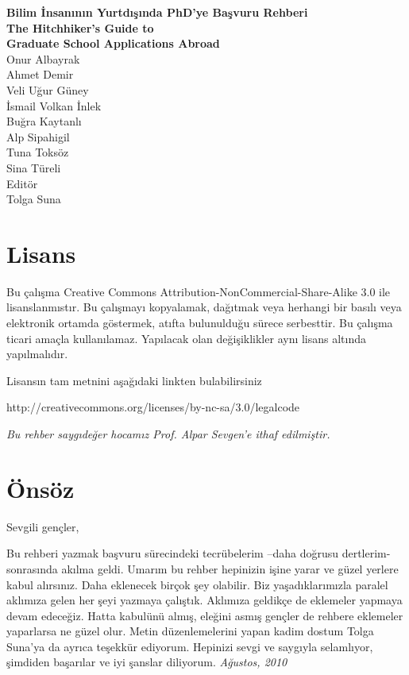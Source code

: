 \documentclass[12pt]{article}
\begin{document}
%
%
\thispagestyle{empty}
\setcounter{page}{0}
\begin{center}
\textbf{\Huge{Bilim İnsanının Yurtdışında PhD'ye Başvuru Rehberi} \\
\vspace{8mm}
\Large{The Hitchhiker's Guide to \\ 
\vspace{4mm}
Graduate School Applications Abroad}}\\

\vspace{92mm}
\Large{Onur Albayrak} 
\\
Ahmet Demir
\\
Veli Uğur Güney 
\\
İsmail Volkan İnlek
\\
Buğra Kaytanlı 
\\
Alp Sipahigil 
\\
Tuna Toksöz 
\\
Sina Türeli 
\\
\vspace{8mm}
\large{
Editör 
\\
Tolga Suna }
\end{center}
%
%
\newpage
\section*{Lisans}

Bu çalışma Creative Commons Attribution-NonCommercial-Share-Alike 3.0 ile lisanslanmıstır. Bu çalışmayı kopyalamak, dağıtmak veya herhangi bir basılı veya elektronik ortamda göstermek, atıfta bulunulduğu sürece serbesttir. Bu çalışma ticari amaçla kullanılamaz. Yapılacak olan değişiklikler aynı lisans altında yapılmalıdır. 

Lisansın tam metnini aşağıdaki linkten bulabilirsiniz

http://creativecommons.org/licenses/by-nc-sa/3.0/legalcode

\byncsa
\newpage
%
%
\vspace*{45mm} 
\textit{Bu rehber saygıdeğer hocamız Prof. Alpar Sevgen'e ithaf edilmiştir.}
%
\newpage
%
%
\tableofcontents
%
\newpage

%
%
\section{Önsöz}
Sevgili gençler,

Bu rehberi yazmak başvuru sürecindeki tecrübelerim –daha doğrusu dertlerim- sonrasında akılma geldi. Umarım bu rehber hepinizin işine yarar ve güzel yerlere kabul alırsınız. Daha eklenecek birçok şey olabilir. Biz yaşadıklarımızla paralel aklımıza gelen her şeyi yazmaya çalıştık. Aklımıza geldikçe de eklemeler yapmaya devam edeceğiz. Hatta kabulünü almış, eleğini asmış gençler de rehbere eklemeler yaparlarsa ne güzel olur. Metin düzenlemelerini yapan kadim dostum Tolga Suna’ya da ayrıca teşekkür ediyorum. Hepinizi sevgi ve saygıyla selamlıyor, şimdiden başarılar ve iyi şanslar diliyorum. \textit{Ağustos, 2010}
\end{document}
